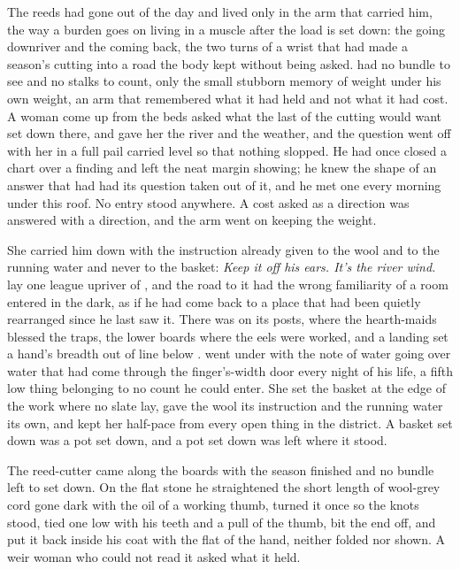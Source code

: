 
The reeds had gone out of the day and lived only in the arm that carried him, the way a burden goes on living in a muscle after the load is set down: the going downriver and the coming back, the two turns of a wrist that had made a season's cutting into a road the body kept without being asked.  had no bundle to see and no stalks to count, only the small stubborn memory of weight under his own weight, an arm that remembered what it had held and not what it had cost. A woman come up from the beds asked what the last of the cutting would want set down there, and  gave her the river and the weather, and the question went off with her in a full pail carried level so that nothing slopped. He had once closed a chart over a finding and left the neat margin showing; he knew the shape of an answer that had had its question taken out of it, and he met one every morning under this roof. No entry stood anywhere. A cost asked as a direction was answered with a direction, and the arm went on keeping the weight.

She carried him down  with the instruction already given to the wool and to the running water and never to the basket: \emph{Keep it off his ears. It's the river wind.}  lay one league upriver of , and the road to it had the wrong familiarity of a room entered in the dark, as if he had come back to a place that had been quietly rearranged since he last saw it. There was  on its posts,  where the hearth-maids blessed the traps, the lower boards where the eels were worked, and a landing set a hand's breadth out of line below .  went under  with the note of water going over water that had come through the finger's-width door every night of his life, a fifth low thing belonging to no count he could enter. She set the basket at the edge of the work where no slate lay, gave the wool its instruction and the running water its own, and kept her half-pace from every open thing in the district. A basket set down was a pot set down, and a pot set down was left where it stood.

The reed-cutter came along the boards with the season finished and no bundle left to set down. On the flat stone he straightened the short length of wool-grey cord gone dark with the oil of a working thumb, turned it once so the knots stood, tied one low with his teeth and a pull of the thumb, bit the end off, and put it back inside his coat with the flat of the hand, neither folded nor shown. A weir woman who could not read it asked what it held.

